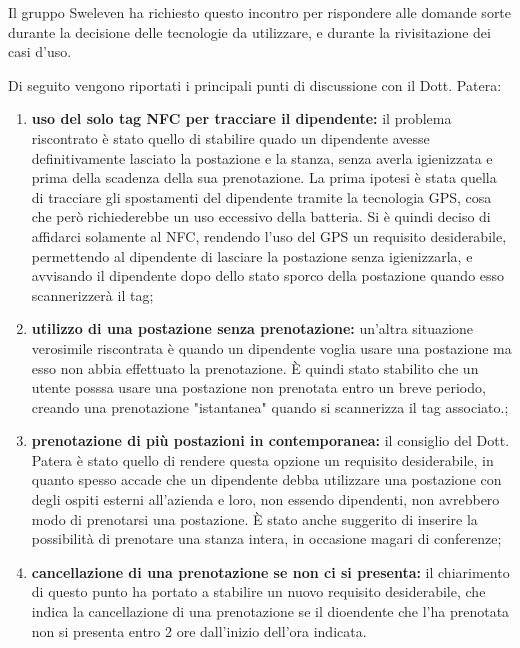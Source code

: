 Il gruppo Sweleven ha richiesto questo incontro per rispondere alle domande sorte durante la decisione delle tecnologie da utilizzare, e durante la rivisitazione dei casi d'uso.

Di seguito vengono riportati i principali punti di discussione con il Dott. Patera:
\begin{enumerate}
    \item \textbf{uso del solo tag NFC per tracciare il dipendente:} il problema riscontrato è stato quello di stabilire quado un dipendente avesse definitivamente lasciato la postazione e la stanza, senza averla igienizzata e prima della scadenza della sua prenotazione. La prima ipotesi è stata quella di tracciare gli spostamenti del dipendente tramite la tecnologia GPS, cosa che però richiederebbe un uso eccessivo della batteria. Si è quindi deciso di affidarci solamente al NFC, rendendo l'uso del GPS un requisito desiderabile, permettendo al dipendente di lasciare la postazione senza igienizzarla, e avvisando il dipendente dopo dello stato sporco della postazione quando esso scannerizzerà il tag;
    \item \textbf{utilizzo di una postazione senza prenotazione:} un'altra situazione verosimile riscontrata è quando un dipendente voglia usare una postazione ma esso non abbia effettuato la prenotazione. È quindi stato stabilito che un utente posssa usare una postazione non prenotata entro un breve periodo, creando una prenotazione "istantanea" quando si scannerizza il tag associato.;
    \item \textbf{prenotazione di più postazioni in contemporanea:} il consiglio del Dott. Patera è stato quello di rendere questa opzione un requisito desiderabile, in quanto spesso accade che un dipendente debba utilizzare una postazione con degli ospiti esterni all'azienda e loro, non essendo dipendenti, non avrebbero modo di prenotarsi una postazione. È stato anche suggerito di inserire la possibilità di prenotare una stanza intera, in occasione magari di conferenze;
    \item \textbf{cancellazione di una prenotazione se non ci si presenta:} il chiarimento di questo punto ha portato a stabilire un nuovo requisito desiderabile, che indica la cancellazione di una prenotazione se il dioendente che l'ha prenotata non si presenta entro 2 ore dall'inizio dell'ora indicata.
 \end{enumerate}